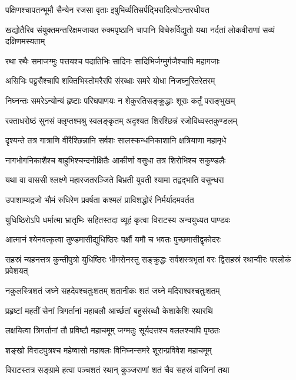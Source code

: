 \twolineshloka
{पक्षिणश्चापतन्भूमौ सैन्येन रजसा वृताः}
{इषुभिर्व्यतिसर्पद्भिरादित्योऽन्तरधीयत}


\onelineshloka
{खद्योतैरिव संयुक्तमन्तरिक्षमजायत}
\twolineshloka
{रुक्मपृष्ठानि चापानि विचेरुर्विद्युतो यथा}
{नर्दतां लोकवीराणां सव्यं दक्षिणमस्यताम्}


\twolineshloka
{रथा रथैः समाजग्मुः पत्तयश्च पदातिभिः}
{सादिनः सादिभिर्जग्मुर्गजैश्चापि महागजाः}


\twolineshloka
{असिभिः पट्टसैश्चापि शक्तिभिस्तोमरैरपि}
{संरब्धाः समरे योधा निजघ्नुरितरेतरम्}


\twolineshloka
{निघ्नन्तः समरेऽन्योन्यं हृष्टाः परिघपाणयः}
{न शेकुरतिसङ्क्रुद्धाः शूराः कर्तुं पराङ्भुखम्}


\twolineshloka
{रक्ताधरोष्ठं सुनसं क्लृप्तश्मश्रु स्वलङ्कृतम्}
{अदृश्यत शिरश्छिन्नं रजोविध्वस्तकुण्डलम्}


\twolineshloka
{दृश्यन्ते तत्र गात्राणि वीरैश्छिन्नानि सर्वशः}
{सालस्कन्धनिकाशानि क्षत्रियाणा महामृधे}


\twolineshloka
{नागभोगनिकाशैश्च बाहुभिश्चन्दनोक्षितैः}
{आकीर्णा वसुधा तत्र शिरोभिश्च सकुण्डलैः}


\twolineshloka
{यथा वा वाससी श्लक्ष्णे महारजतरञ्जिते}
{बिभ्रती युवती श्यामा तद्वद्भाति वसुन्धरा}


\twolineshloka
{उपाशाम्यद्रजो भौमं रुधिरेण प्रवर्षता}
{कश्मलं प्राविशद्धोरं निर्मर्यादमवर्तत}


\twolineshloka
{युधिष्ठिरोऽपि धर्मात्मा भ्रातृभिः सहितस्तदा}
{व्यूहं कृत्वा विराटस्य अन्वयुध्यत पाण्डवः}


\twolineshloka
{आत्मानं श्येनवत्कृत्वा तुण्डमासीद्युधिष्ठिरः}
{पक्षौं यमौ च भवतः पुच्छमासीद्वृकोदरः}


\threelineshloka
{सहस्रं न्यहनत्तत्र कुन्तीपुत्रो युधिष्ठिरः}
{भीमसेनस्तु सङ्क्रुद्धः सर्वशस्त्रभृतां वरः}
{द्विसहस्रं रथान्वीरः परलोकं प्रवेशयत्}


\twolineshloka
{नकुलस्त्रिशतं जघ्ने सहदेवश्चतुःशतम्}
{शतानीकः शतं जघ्ने मदिराश्वश्चतुःशतम्}


\twolineshloka
{प्रहृष्टां महतीं सेनां त्रिगर्तानां महाबलौ}
{आर्च्छतां बहुसंरब्धौ केशाकेशि रथारथि}


\twolineshloka
{लक्षयित्वा त्रिगर्तानां तौ प्रविष्टौ महाचमूम्}
{जग्मतुः सूर्यदत्तश्च वललश्चापि पृष्ठतः}


\twolineshloka
{शङ्खो विराटपुत्रश्च महेष्वासो महाबलः}
{विनिघ्नन्समरे शूरान्प्रविवेश महाचमूम्}


\twolineshloka
{विराटस्तत्र सङ्ग्रामे हत्वा पञ्चशतं रथान्}
{कुञ्जराणां शतं चैव सहस्रं वाजिनां तथा}


